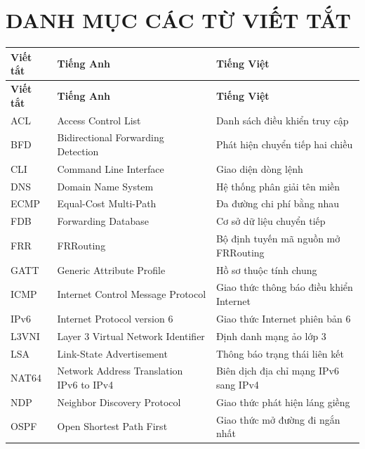 \newpage
\section*{DANH MỤC CÁC TỪ VIẾT TẮT}

\begin{center}
\begin{longtable}{|p{2.5cm}|p{6cm}|p{6cm}|}
    \hline
    \textbf{Viết tắt} & \textbf{Tiếng Anh} & \textbf{Tiếng Việt} \\
    \hline
    \endfirsthead
    \hline
    \textbf{Viết tắt} & \textbf{Tiếng Anh} & \textbf{Tiếng Việt} \\
    \hline
    \endhead
    \hline
    \endfoot
    
    ACL & Access Control List & Danh sách điều khiển truy cập \\
    \hline
    BFD & Bidirectional Forwarding Detection & Phát hiện chuyển tiếp hai chiều \\
    \hline
    CLI & Command Line Interface & Giao diện dòng lệnh \\
    \hline
    DNS & Domain Name System & Hệ thống phân giải tên miền \\
    \hline
    ECMP & Equal-Cost Multi-Path & Đa đường chi phí bằng nhau \\
    \hline
    FDB & Forwarding Database & Cơ sở dữ liệu chuyển tiếp \\
    \hline
    FRR & FRRouting & Bộ định tuyến mã nguồn mở FRRouting \\
    \hline
    GATT & Generic Attribute Profile & Hồ sơ thuộc tính chung \\
    \hline
    ICMP & Internet Control Message Protocol & Giao thức thông báo điều khiển Internet \\
    \hline
    IPv6 & Internet Protocol version 6 & Giao thức Internet phiên bản 6 \\
    \hline
    L3VNI & Layer 3 Virtual Network Identifier & Định danh mạng ảo lớp 3 \\
    \hline
    LSA & Link-State Advertisement & Thông báo trạng thái liên kết \\
    \hline
    NAT64 & Network Address Translation IPv6 to IPv4 & Biên dịch địa chỉ mạng IPv6 sang IPv4 \\
    \hline
    NDP & Neighbor Discovery Protocol & Giao thức phát hiện láng giềng \\
    \hline
    OSPF & Open Shortest Path First & Giao thức mở đường đi ngắn nhất \\

\end{longtable}
\end{center}
